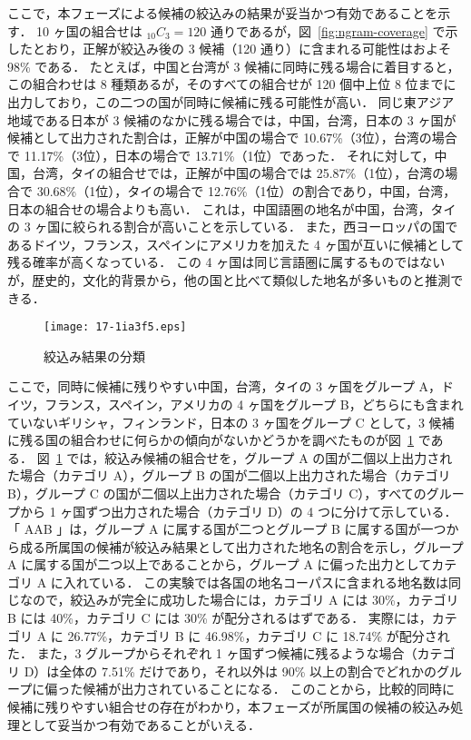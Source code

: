 \documentclass[japanese]{jnlp_1.4}
\begin{document}
ここで，本フェーズによる候補の絞込みの結果が妥当かつ有効であることを示す．
10 ヶ国の組合せは ${}_{10}C_3 = 120$ 通りであるが，図~\ref{fig:ngram-coverage} で示したとおり，正解が絞込み後の 3 候補（120 通り）に含まれる可能性はおよそ 98\% である．
たとえば，中国と台湾が 3 候補に同時に残る場合に着目すると，この組合わせは 8 種類あるが，そのすべての組合せが 120 個中上位 8 位までに出力しており，この二つの国が同時に候補に残る可能性が高い．
同じ東アジア地域である日本が 3 候補のなかに残る場合では，中国，台湾，日本の 3 ヶ国が候補として出力された割合は，正解が中国の場合で 10.67\%（3位），台湾の場合で 11.17\%（3位），日本の場合で 13.71\%（1位）であった．
それに対して，中国，台湾，タイの組合せでは，正解が中国の場合では 25.87\%（1位），台湾の場合で 30.68\%（1位），タイの場合で 12.76\%（1位）の割合であり，中国，台湾，日本の組合せの場合よりも高い．
これは，中国語圏の地名が中国，台湾，タイの 3 ヶ国に絞られる割合が高いことを示している．
また，西ヨーロッパの国であるドイツ，フランス，スペインにアメリカを加えた 4 ヶ国が互いに候補として残る確率が高くなっている．
この 4 ヶ国は同じ言語圏に属するものではないが，歴史的，文化的背景から，他の国と比べて類似した地名が多いものと推測できる．

\begin{figure}[b]
\vspace{-0.5\baselineskip}
 \begin{center}
  \texttt{[image: 17-1ia3f5.eps]}
 \end{center}
  \caption{絞込み結果の分類}
  \label{fig:ngram-output-category}
\end{figure}

ここで，同時に候補に残りやすい中国，台湾，タイの 3 ヶ国をグループ A，ドイツ，フランス，スペイン，アメリカの 4 ヶ国をグループ B，どちらにも含まれていないギリシャ，フィンランド，日本の 3 ヶ国をグループ C として，3 候補に残る国の組合わせに何らかの傾向がないかどうかを調べたものが図~\ref{fig:ngram-output-category} である．
図~\ref{fig:ngram-output-category} では，絞込み候補の組合せを，グループ A の国が二個以上出力された場合（カテゴリ A），グループ B の国が二個以上出力された場合（カテゴリ B），グループ C の国が二個以上出力された場合（カテゴリ C），すべてのグループから 1 ヶ国ずつ出力された場合（カテゴリ D）の 4 つに分けて示している．
「 AAB 」は，グループ A に属する国が二つとグループ B に属する国が一つから成る所属国の候補が絞込み結果として出力された地名の割合を示し，グループ A に属する国が二つ以上であることから，グループ A に偏った出力としてカテゴリ A に入れている．
この実験では各国の地名コーパスに含まれる地名数は同じなので，絞込みが完全に成功した場合には，カテゴリ A には 30\%，カテゴリ B には 40\%，カテゴリ C には 30\% が配分されるはずである．
実際には，カテゴリ A に 26.77\%，カテゴリ B に 46.98\%，カテゴリ C に 18.74\% が配分された．
また，3 グループからそれぞれ 1 ヶ国ずつ候補に残るような場合（カテゴリ D）は全体の 7.51\% だけであり，それ以外は 90\% 以上の割合でどれかのグループに偏った候補が出力されていることになる．
このことから，比較的同時に候補に残りやすい組合せの存在がわかり，本フェーズが所属国の候補の絞込み処理として妥当かつ有効であることがいえる．
\end{document}
